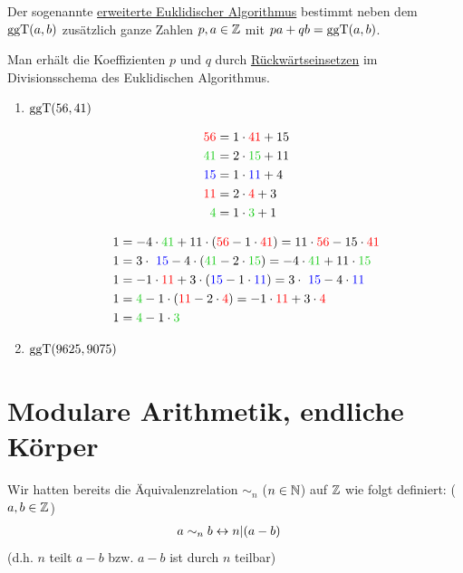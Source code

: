 
Der sogenannte \ul{erweiterte Euklidischer Algorithmus} bestimmt neben dem $\mathbin\text{ggT}(a,b)$ zusätzlich ganze Zahlen $p,a\in\mathbb{Z}$ mit $pa+qb=\mathbin\text{ggT}(a,b)$.

Man erhält die Koeffizienten $p$ und $q$ durch \ul{{\flqq Rückwärtseinsetzen\frqq}} im Divisionsschema des Euklidischen Algorithmus.

\Bsps
\begin{enumerate}
	\item $\mathbin\text{ggT}(56,41)$\\
	\begin{minipage}{0.3\linewidth}
		\begin{align*}
		\red{56} &=1\cdot \red{41}+15\\
		\green{41} &=2\cdot \green{15}+11\\
		\blue{15} &=1\cdot \blue{11}+4\\
		\red{11} &=2\cdot \red{4}+3\\
		\green{4} &=1\cdot \green{3}+1
		\end{align*}
	\end{minipage}
	\begin{minipage}{0.6\linewidth}
		\begin{align*}
		1 &=-4\cdot\green{41}+11\cdot(\red{56}-1\cdot \red{41}) = 11\cdot\red{56}-15\cdot\red{41}\\
		1 &=3\cdot\ \blue{15}-4\cdot(\green{41}- 2\cdot \green{15}) = -4\cdot\green{41}+11\cdot\green{15}\\
		1 &=-1\cdot\red{11}+3\cdot(\blue{15} - 1\cdot \blue{11}) = 3\cdot\ \blue{15}-4\cdot\blue{11}\\
		1 &= \green{4} - 1\cdot(\red{11} -2\cdot \red{4})= -1\cdot\red{11}+3\cdot\red{4}\\
		1 &= \green{4} - 1\cdot\green{3}
		\end{align*}
	\end{minipage}
	
	\item $\mathbin\text{ggT}(9625,9075)$\\
\end{enumerate}

\clearpage
\section{Modulare Arithmetik, endliche Körper}
Wir hatten bereits die Äquivalenzrelation $\sim_n$ ($n\in\mathbb{N}$) auf $\mathbb{Z}$ wie folgt definiert: ($a,b\in\mathbb{Z}$)
\begin{align*}
a&\sim_n b\leftrightarrow n|(a-b)
\end{align*}
(d.h. $n$ teilt $a-b$ bzw. $a-b$ ist durch $n$ teilbar)

